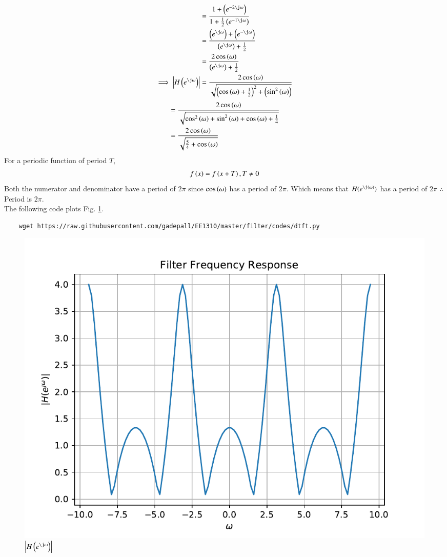 \documentclass[journal,12pt,twocolumn]{IEEEtran}
\renewcommand\thesection{\arabic{section}}
\begin{document}
\begin{enumerate}[label=\thesection.\arabic*]
\begin{align}
	&=\frac{1 + \brak{e^{-2\j \omega}}}{1 + \frac{1}{2}\brak{e^{-1\j \omega}}}\\
	&=\frac{\brak{e^{\j \omega}} + \brak{e^{-\j \omega}}}{\brak{e^{\j \omega}} + \frac{1}{2}}\\
	&=\frac{2\cos\brak{\omega}}{\brak{e^{\j \omega}} + \frac{1}{2}}\\
	\implies \abs{H\brak{e^{\j \omega}}} &= \frac{2\cos\brak{\omega}}{\sqrt{\brak{\cos\brak{\omega}+\frac{1}{2}}^{2}+\brak{\sin^2\brak{\omega}}}}
\end{align}
\begin{align}
	&=\frac{2\cos\left(\omega\right)}{\sqrt{\cos^2\left(\omega\right)+\sin^2\left(\omega\right)+\cos\left(\omega\right)+\frac{1}{4}}}\\
	&=\frac{2\cos\left(\omega\right)}{\sqrt{\frac{5}{4}+\cos\left(\omega\right)}}\\
\end{align}
For a periodic function of period $T$,
\begin{align}
	f\left(x\right) = f\left(x+T\right), T \neq 0	 
\end{align}
Both the numerator and denominator have a period of $2\pi$ since $\cos\left(\omega\right)$ has a period of $2\pi$. Which means that $H(e^{\j (\omega)})$ has a period of $2\pi$
$\therefore$ Period is $2\pi$.\\
The following code plots Fig. \ref{fig:dtft}.
\begin{lstlisting}
	wget https://raw.githubusercontent.com/gadepall/EE1310/master/filter/codes/dtft.py
\end{lstlisting}
\begin{figure}[!ht]
	\centering
	\includegraphics[width=\columnwidth]{./figs/dtft}
	\caption{$\abs{H\brak{e^{\j\omega}}}$}
	\label{fig:dtft}
\end{figure}


\end{enumerate}
\end{document}
